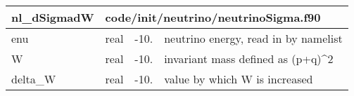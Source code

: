 \documentclass{article}
\begin{document}
\begin{longtable}{llll}
\toprule
\textbf{\large{nl\_dSigmadW}} & \multicolumn{3}{l}{\footnotesize{code/init/neutrino/neutrinoSigma.f90}}\\*
\midrule
\endfirsthead
\midrule
\endhead
enu & \begin{minipage}[t]{2cm}real\end{minipage} & \begin{minipage}[t]{2cm}-10.\end{minipage} & \begin{minipage}[t]{12cm}neutrino energy, read in by namelist\end{minipage}\\*
\midrule
W & \begin{minipage}[t]{2cm}real\end{minipage} & \begin{minipage}[t]{2cm}-10.\end{minipage} & \begin{minipage}[t]{12cm}invariant mass defined as (p+q)\^{}2\end{minipage}\\*
\midrule
delta\_W & \begin{minipage}[t]{2cm}real\end{minipage} & \begin{minipage}[t]{2cm}-10.\end{minipage} & \begin{minipage}[t]{12cm}value by which W is increased\end{minipage}\\*
\bottomrule
\end{longtable}
{ }



\end{document}
